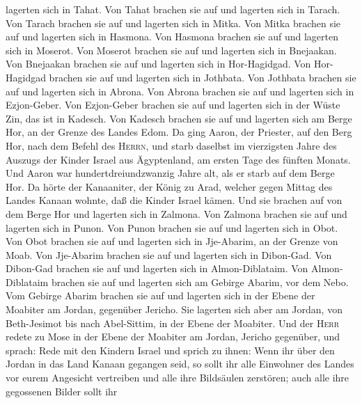lagerten sich in Tahat.  Von Tahat brachen sie auf und
lagerten sich in Tarach.  Von Tarach brachen sie auf und
lagerten sich in Mitka.  Von Mitka brachen sie auf und
lagerten sich in Hasmona.  Von Hasmona brachen sie auf
und lagerten sich in Moserot.  Von Moserot brachen sie
auf und lagerten sich in Bnejaakan.  Von Bnejaakan
brachen sie auf und lagerten sich in Hor-Hagidgad.  Von
Hor-Hagidgad brachen sie auf und lagerten sich in Jothbata.
 Von Jothbata brachen sie auf und lagerten sich in
Abrona.  Von Abrona brachen sie auf und lagerten sich in
Ezjon-Geber.  Von Ezjon-Geber brachen sie auf und
lagerten sich in der Wüste Zin, das ist in Kadesch.  Von
Kadesch brachen sie auf und lagerten sich am Berge Hor, an der Grenze
des Landes Edom.  Da ging Aaron, der Priester, auf den
Berg Hor, nach dem Befehl des \textsc{Herrn}, und starb daselbst im
vierzigsten Jahre des Auszugs der Kinder Israel aus Ägyptenland, am
ersten Tage des fünften Monats.  Und Aaron war
hundertdreiundzwanzig Jahre alt, als er starb auf dem Berge Hor.
 Da hörte der Kanaaniter, der König zu Arad, welcher
gegen Mittag des Landes Kanaan wohnte, daß die Kinder Israel kämen.
 Und sie brachen auf von dem Berge Hor und lagerten sich
in Zalmona.  Von Zalmona brachen sie auf und lagerten
sich in Punon.  Von Punon brachen sie auf und lagerten
sich in Obot.  Von Obot brachen sie auf und lagerten sich
in Jje-Abarim, an der Grenze von Moab.  Von Jje-Abarim
brachen sie auf und lagerten sich in Dibon-Gad.  Von
Dibon-Gad brachen sie auf und lagerten sich in Almon-Diblataim.
 Von Almon-Diblataim brachen sie auf und lagerten sich am
Gebirge Abarim, vor dem Nebo.  Vom Gebirge Abarim brachen
sie auf und lagerten sich in der Ebene der Moabiter am Jordan, gegenüber
Jericho.  Sie lagerten sich aber am Jordan, von
Beth-Jesimot bis nach Abel-Sittim, in der Ebene der Moabiter.
 Und der \textsc{Herr} redete zu Mose in der Ebene der
Moabiter am Jordan, Jericho gegenüber, und sprach:  Rede
mit den Kindern Israel und sprich zu ihnen: Wenn ihr über den Jordan in
das Land Kanaan gegangen seid,  so sollt ihr alle
Einwohner des Landes vor eurem Angesicht vertreiben und alle ihre
Bildsäulen zerstören; auch alle ihre gegossenen Bilder sollt ihr
